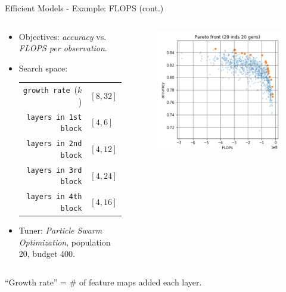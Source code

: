 \documentclass[11pt,compress,t,notes=noshow,xcolor=table]{beamer}
\begin{document}
\begin{vbframe}{Efficient Models - Example: FLOPS (cont.)}

\begin{columns}
\begin{column}{0.65\textwidth}
\begin{itemize}
  \item Objectives: \emph{accuracy} vs. \emph{FLOPS per observation}.
  \item Search space:
    \begin{tabular}{rl}
      \texttt{growth rate}~($k$)       & $[8,32]$ \\
      \texttt{layers in 1st block}     & $[4,6]$ \\
      \texttt{layers in 2nd block}     & $[4,12]$ \\
      \texttt{layers in 3rd block}     & $[4,24]$ \\
      \texttt{layers in 4th block}     & $[4,16]$ 
    \end{tabular}
  \item Tuner: \emph{Particle Swarm Optimization}, population 20, budget 400.
\end{itemize}
\end{column}
\begin{column}{0.35\textwidth}
\begin{figure}
\includegraphics[width=\textwidth]{figure_man/Wang_et_al_2019_Evolving_Deep_Neural_Networks_fig7_1.png}
\end{figure}
\end{column}
\end{columns}

{\footnotesize “Growth rate” = \# of feature maps added each layer.}

\end{vbframe}
\end{document}
